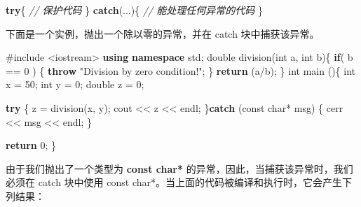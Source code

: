 \documentclass[
]{article}
\newenvironment{Shaded}{}{}
\newcommand{\AttributeTok}[1]{\textcolor[rgb]{0.49,0.56,0.16}{#1}}
\newcommand{\CommentTok}[1]{\textcolor[rgb]{0.38,0.63,0.69}{\textit{#1}}}
\newcommand{\ControlFlowTok}[1]{\textcolor[rgb]{0.00,0.44,0.13}{\textbf{#1}}}
\newcommand{\DataTypeTok}[1]{\textcolor[rgb]{0.56,0.13,0.00}{#1}}
\newcommand{\DecValTok}[1]{\textcolor[rgb]{0.25,0.63,0.44}{#1}}
\newcommand{\ImportTok}[1]{#1}
\newcommand{\KeywordTok}[1]{\textcolor[rgb]{0.00,0.44,0.13}{\textbf{#1}}}
\newcommand{\NormalTok}[1]{#1}
\newcommand{\OperatorTok}[1]{\textcolor[rgb]{0.40,0.40,0.40}{#1}}
\newcommand{\PreprocessorTok}[1]{\textcolor[rgb]{0.74,0.48,0.00}{#1}}
\newcommand{\StringTok}[1]{\textcolor[rgb]{0.25,0.44,0.63}{#1}}
\begin{document}
\begin{Shaded}
\begin{Highlighting}[]
\ControlFlowTok{try}\OperatorTok{\{}
   \CommentTok{// 保护代码}
\OperatorTok{\}}
\ControlFlowTok{catch}\OperatorTok{(...)\{}
  \CommentTok{// 能处理任何异常的代码}
\OperatorTok{\}}
\end{Highlighting}
\end{Shaded}

下面是一个实例，抛出一个除以零的异常，并在 catch 块中捕获该异常。

\begin{Shaded}
\begin{Highlighting}[]
\PreprocessorTok{\#include }\ImportTok{\textless{}iostream\textgreater{}}
\KeywordTok{using} \KeywordTok{namespace}\NormalTok{ std}\OperatorTok{;}
\DataTypeTok{double}\NormalTok{ division}\OperatorTok{(}\DataTypeTok{int}\NormalTok{ a}\OperatorTok{,} \DataTypeTok{int}\NormalTok{ b}\OperatorTok{)\{}
   \ControlFlowTok{if}\OperatorTok{(}\NormalTok{ b }\OperatorTok{==} \DecValTok{0} \OperatorTok{)}
   \OperatorTok{\{}
      \ControlFlowTok{throw} \StringTok{"Division by zero condition!"}\OperatorTok{;}
   \OperatorTok{\}}
   \ControlFlowTok{return} \OperatorTok{(}\NormalTok{a}\OperatorTok{/}\NormalTok{b}\OperatorTok{);}
\OperatorTok{\}}
\DataTypeTok{int}\NormalTok{ main }\OperatorTok{()\{}
   \DataTypeTok{int}\NormalTok{ x }\OperatorTok{=} \DecValTok{50}\OperatorTok{;}
   \DataTypeTok{int}\NormalTok{ y }\OperatorTok{=} \DecValTok{0}\OperatorTok{;}
   \DataTypeTok{double}\NormalTok{ z }\OperatorTok{=} \DecValTok{0}\OperatorTok{;}
 
   \ControlFlowTok{try} \OperatorTok{\{}
\NormalTok{     z }\OperatorTok{=}\NormalTok{ division}\OperatorTok{(}\NormalTok{x}\OperatorTok{,}\NormalTok{ y}\OperatorTok{);}
\NormalTok{     cout }\OperatorTok{\textless{}\textless{}}\NormalTok{ z }\OperatorTok{\textless{}\textless{}}\NormalTok{ endl}\OperatorTok{;}
   \OperatorTok{\}}\ControlFlowTok{catch} \OperatorTok{(}\AttributeTok{const} \DataTypeTok{char}\OperatorTok{*}\NormalTok{ msg}\OperatorTok{)} \OperatorTok{\{}
\NormalTok{     cerr }\OperatorTok{\textless{}\textless{}}\NormalTok{ msg }\OperatorTok{\textless{}\textless{}}\NormalTok{ endl}\OperatorTok{;}
   \OperatorTok{\}}

   \ControlFlowTok{return} \DecValTok{0}\OperatorTok{;}
\OperatorTok{\}}
\end{Highlighting}
\end{Shaded}

由于我们抛出了一个类型为 \textbf{const char*}
的异常，因此，当捕获该异常时，我们必须在 catch 块中使用 const
char*。当上面的代码被编译和执行时，它会产生下列结果：
\end{document}

